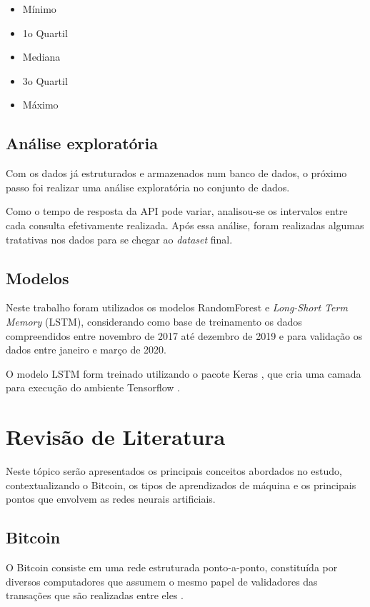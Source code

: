 \documentclass[12pt]{article}
\begin{document}
\begin{itemize}
  \item Mínimo
  \item 1o Quartil
  \item Mediana
  \item 3o Quartil
  \item Máximo
\end{itemize}

\subsection{Análise exploratória}

Com os dados já estruturados e armazenados num banco de dados, o próximo passo
foi realizar uma análise exploratória no conjunto de dados. 

Como o tempo de resposta da API pode variar, analisou-se os intervalos entre 
cada consulta efetivamente realizada. Após essa análise, foram realizadas 
algumas tratativas nos dados para se chegar ao \textit{dataset} final.

\subsection{Modelos}

Neste trabalho foram utilizados os modelos RandomForest e 
\textit{Long-Short Term Memory} (LSTM), considerando como base de treinamento
os dados compreendidos entre novembro de 2017 até dezembro de 2019 e para 
validação os dados entre janeiro e março de 2020.

O modelo LSTM form treinado utilizando o pacote Keras \cite{chollet2015}, que 
cria uma camada para execução do ambiente Tensorflow \cite{tensorflow2015}.

\section{Revisão de Literatura}

Neste tópico serão apresentados os principais conceitos abordados no estudo,
contextualizando o Bitcoin, os tipos de aprendizados de máquina e os principais 
pontos que envolvem as redes neurais artificiais.

\subsection{Bitcoin}

O Bitcoin consiste em uma rede estruturada ponto-a-ponto, constituída por 
diversos computadores que assumem o mesmo papel de validadores das transações 
que são realizadas entre eles \cite{nakamoto2019bitcoin}.
\end{document}
